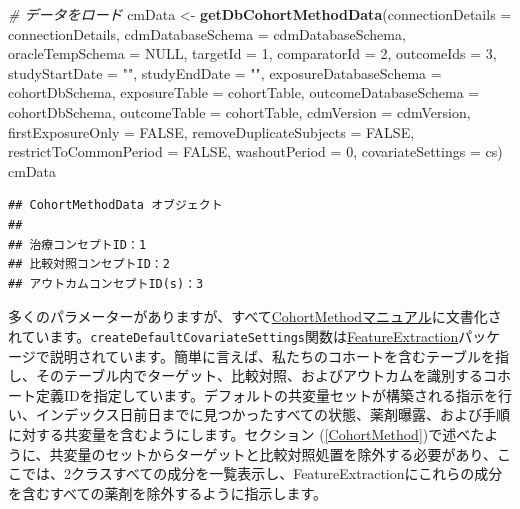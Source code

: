 \documentclass[
  11pt]{book}
\newenvironment{Shaded}{\begin{snugshade}}{\end{snugshade}}
\newcommand{\AttributeTok}[1]{\textcolor[rgb]{0.13,0.29,0.53}{#1}}
\newcommand{\CommentTok}[1]{\textcolor[rgb]{0.56,0.35,0.01}{\textit{#1}}}
\newcommand{\ConstantTok}[1]{\textcolor[rgb]{0.56,0.35,0.01}{#1}}
\newcommand{\DecValTok}[1]{\textcolor[rgb]{0.00,0.00,0.81}{#1}}
\newcommand{\FunctionTok}[1]{\textcolor[rgb]{0.13,0.29,0.53}{\textbf{#1}}}
\newcommand{\NormalTok}[1]{#1}
\newcommand{\OtherTok}[1]{\textcolor[rgb]{0.56,0.35,0.01}{#1}}
\newcommand{\StringTok}[1]{\textcolor[rgb]{0.31,0.60,0.02}{#1}}
\theoremstyle{definition}
\theoremstyle{definition}
\theoremstyle{definition}
\theoremstyle{definition}
\theoremstyle{remark}
\begin{document}
\begin{Shaded}
\begin{Highlighting}[]
\CommentTok{\# データをロード}
\NormalTok{cmData }\OtherTok{\textless{}{-}} \FunctionTok{getDbCohortMethodData}\NormalTok{(}\AttributeTok{connectionDetails =}\NormalTok{ connectionDetails,}
                                \AttributeTok{cdmDatabaseSchema =}\NormalTok{ cdmDatabaseSchema,}
                                \AttributeTok{oracleTempSchema =} \ConstantTok{NULL}\NormalTok{,}
                                \AttributeTok{targetId =} \DecValTok{1}\NormalTok{,}
                                \AttributeTok{comparatorId =} \DecValTok{2}\NormalTok{,}
                                \AttributeTok{outcomeIds =} \DecValTok{3}\NormalTok{,}
                                \AttributeTok{studyStartDate =} \StringTok{""}\NormalTok{,}
                                \AttributeTok{studyEndDate =} \StringTok{""}\NormalTok{,}
                                \AttributeTok{exposureDatabaseSchema =}\NormalTok{ cohortDbSchema,}
                                \AttributeTok{exposureTable =}\NormalTok{ cohortTable,}
                                \AttributeTok{outcomeDatabaseSchema =}\NormalTok{ cohortDbSchema,}
                                \AttributeTok{outcomeTable =}\NormalTok{ cohortTable,}
                                \AttributeTok{cdmVersion =}\NormalTok{ cdmVersion,}
                                \AttributeTok{firstExposureOnly =} \ConstantTok{FALSE}\NormalTok{,}
                                \AttributeTok{removeDuplicateSubjects =} \ConstantTok{FALSE}\NormalTok{,}
                                \AttributeTok{restrictToCommonPeriod =} \ConstantTok{FALSE}\NormalTok{,}
                                \AttributeTok{washoutPeriod =} \DecValTok{0}\NormalTok{,}
                                \AttributeTok{covariateSettings =}\NormalTok{ cs)}
\NormalTok{cmData}
\end{Highlighting}
\end{Shaded}

\begin{verbatim}
## CohortMethodData オブジェクト
## 
## 治療コンセプトID：1
## 比較対照コンセプトID：2
## アウトカムコンセプトID(s)：3
\end{verbatim}

多くのパラメーターがありますが、すべて\href{https://ohdsi.github.io/CohortMethod/reference/}{CohortMethodマニュアル}に文書化されています。\texttt{createDefaultCovariateSettings}関数は\href{https://ohdsi.github.io/FeatureExtraction/}{FeatureExtraction}パッケージで説明されています。簡単に言えば、私たちのコホートを含むテーブルを指し、そのテーブル内でターゲット、比較対照、およびアウトカムを識別するコホート定義IDを指定しています。デフォルトの共変量セットが構築される指示を行い、インデックス日前日までに見つかったすべての状態、薬剤曝露、および手順に対する共変量を含むようにします。セクション (\ref{CohortMethod})で述べたように、共変量のセットからターゲットと比較対照処置を除外する必要があり、ここでは、2クラスすべての成分を一覧表示し、FeatureExtractionにこれらの成分を含むすべての薬剤を除外するように指示します。
\end{document}
